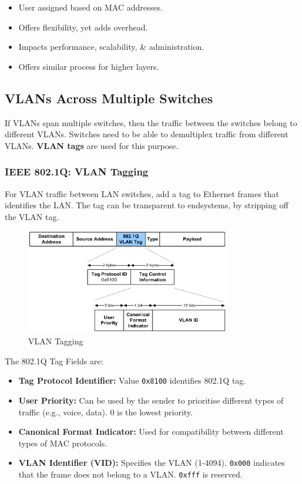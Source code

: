 \documentclass[a4paper,11pt]{article}
\begin{document}
\begin{itemize}
    \item   User assigned based on MAC addresses. 
    \item   Offers flexibility, yet adds overhead. 
    \item   Impacts performance, scalability, \& administration. 
    \item   Offers similar process for higher layers.
\end{itemize}

\subsection{VLANs Across Multiple Switches}
If VLANs span multiple switches, then the traffic between the switches belong to different VLANs.
Switches need to be able to demultiplex traffic from different VLANs.
\textbf{VLAN tags} are used for this purpose.

\subsubsection{IEEE 802.1Q: VLAN Tagging}
For VLAN traffic between LAN switches, add a tag to Ethernet frames that identifies the LAN. 
The tag can be transparent to endsystems, by stripping off the VLAN tag.
\begin{figure}[H]
    \centering
    \includegraphics[width=0.8\textwidth]{./images/vlan_tagging.png}
    \caption{VLAN Tagging}
\end{figure}

The 802.1Q Tag Fields are:
\begin{itemize}
    \item   \textbf{Tag Protocol Identifier:} Value \verb|0x8100| identifies 802.1Q tag. 
    \item   \textbf{User Priority:} Can be used by the sender to prioritise different types of traffic (e.g., voice, data).
            0 is the lowest priority.
    \item   \textbf{Canonical Format Indicator:} Used for compatibility between different types of MAC protocols.
    \item   \textbf{VLAN Identifier (VID):} Specifies the VLAN (1-4094). \verb|0x000| indicates that the frame does not 
            belong to a VLAN. \verb|0xfff| is reserved.
\end{itemize}
\end{document}
